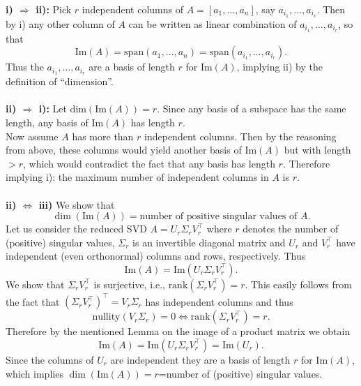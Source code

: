 {\color{solution}
\textbf{i) $\Rightarrow$ ii):} Pick $r$ independent columns of $A = [a_1,\ldots,a_n]$, say $a_{i_1},\ldots,a_{i_r}$. Then by i) any other column of $A$ can be written as linear combination of $a_{i_1},\ldots,a_{i_r}$, so that $$\text{Im}(A)= \text{span}(a_{1},\ldots,a_{n})= \text{span}(a_{i_1},\ldots,a_{i_r}).$$ Thus the $a_{i_1},\ldots,a_{i_r}$ are a basis of length $r$ for $\text{Im}(A)$, implying ii) by the definition of ``dimension''.\\~\\
\textbf{ii) $\Rightarrow$ i):} 
Let $\text{dim}(\text{Im}(A))= r$. Since any basis of a subspace has the same length, any basis of $\text{Im}(A)$ has length $r$.\\
Now assume $A$ has more than $r$ independent columns. Then by the reasoning from above, these columns would yield another basis of $\text{Im}(A)$ but with length $>r$, which would contradict the fact that any basis has length $r$. Therefore implying i): the maximum number of independent columns in $A$ is $r$. \\~\\
\textbf{ii) $\Leftrightarrow$ iii)} We show that $$\dim(\text{Im}(A)) = \text{number of positive singular values of }A .$$
Let us consider the reduced SVD $A = U_r \Sigma_r V_r^\top$ where $r$ denotes the number of (positive) singular values, $\Sigma_r$ is an invertible diagonal matrix and $U_r$ and $V_r^\top$ have independent (even orthonormal) columns and rows, respectively. Thus
$$\text{Im}(A) = \text{Im}(U_r \Sigma_r V_r^\top). $$
We show that $\Sigma_r V_r^\top$ is surjective, i.e., $\text{rank}(\Sigma_r V_r^\top) = r$. This easily follows from the fact that $(\Sigma_r V_r^\top)^\top = V_r\Sigma_r $ has independent columns and thus $$\text{nullity}(V_r\Sigma_r) = 0 \Leftrightarrow \text{rank}(\Sigma_r V_r^\top) = r.$$ Therefore by the mentioned Lemma on the image of a product matrix we obtain
$$\text{Im}(A) = \text{Im}(U_r \Sigma_r V_r^\top)= \text{Im}(U_r).$$
Since the columns of $U_r$ are independent they are a basis of length $r$ for $\text{Im}(A)$, which implies $\dim(\text{Im}(A))=r$=number of (positive) singular values.

}
